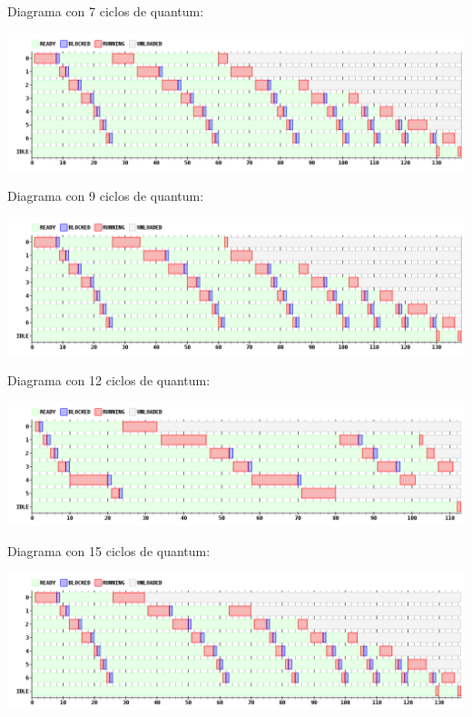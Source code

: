 \par Diagrama con 7 ciclos de quantum:
\begin {center}
\includegraphics[width=16cm]{../simusched/outputs/ej7/rr-ej7-1-7.png}
\end {center}

\par Diagrama con 9 ciclos de quantum:
\begin {center}
\includegraphics[width=16cm]{../simusched/outputs/ej7/rr-ej7-1-9.png}
\end {center}

\par Diagrama con 12 ciclos de quantum:
\begin {center}
\includegraphics[width=16cm]{../simusched/outputs/ej7/rr-ej7-1-12.png}
\end {center}

\par Diagrama con 15 ciclos de quantum:
\begin {center}
\includegraphics[width=16cm]{../simusched/outputs/ej7/rr-ej7-1-15.png}
\end {center}


